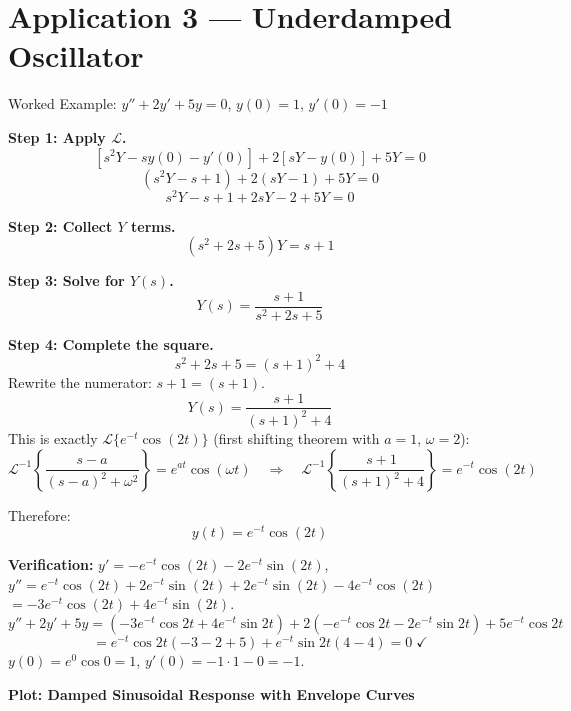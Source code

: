 \documentclass[12pt,a4paper]{article}
\begin{document}
\section{Application 3 --- Underdamped Oscillator}

\begin{infobox}{Worked Example: $y'' + 2y' + 5y = 0$, $y(0)=1$, $y'(0)=-1$}

\textbf{Step 1: Apply $\mathcal{L}$.}
\[
[s^2Y - sy(0) - y'(0)] + 2[sY - y(0)] + 5Y = 0
\]
\[
(s^2Y - s + 1) + 2(sY - 1) + 5Y = 0
\]
\[
s^2Y - s + 1 + 2sY - 2 + 5Y = 0
\]

\textbf{Step 2: Collect $Y$ terms.}
\[
(s^2 + 2s + 5)Y = s + 1
\]

\textbf{Step 3: Solve for $Y(s)$.}
\[
Y(s) = \frac{s+1}{s^2 + 2s + 5}
\]

\textbf{Step 4: Complete the square.}
\[
s^2 + 2s + 5 = (s+1)^2 + 4
\]
Rewrite the numerator: $s + 1 = (s+1)$.
\[
Y(s) = \frac{s+1}{(s+1)^2 + 4}
\]
This is exactly $\mathcal{L}\{e^{-t}\cos(2t)\}$ (first shifting theorem with $a=1$, $\omega=2$):
\[
\mathcal{L}^{-1}\!\left\{\frac{s-a}{(s-a)^2+\omega^2}\right\} = e^{at}\cos(\omega t)
\quad\Rightarrow\quad
\mathcal{L}^{-1}\!\left\{\frac{s+1}{(s+1)^2+4}\right\} = e^{-t}\cos(2t)
\]

Therefore:
\[
\boxed{y(t) = e^{-t}\cos(2t)}
\]

\textbf{Verification:}
$y' = -e^{-t}\cos(2t) - 2e^{-t}\sin(2t)$, \quad
$y'' = e^{-t}\cos(2t) + 2e^{-t}\sin(2t) + 2e^{-t}\sin(2t) - 4e^{-t}\cos(2t)$
$= -3e^{-t}\cos(2t) + 4e^{-t}\sin(2t)$.
\[
y''+2y'+5y = (-3e^{-t}\cos 2t+4e^{-t}\sin 2t)+2(-e^{-t}\cos 2t-2e^{-t}\sin 2t)+5e^{-t}\cos 2t
\]
\[
= e^{-t}\cos 2t(-3-2+5) + e^{-t}\sin 2t(4-4) = 0\;\checkmark
\]
$y(0)=e^0\cos 0=1$\;\checkmark, \;$y'(0)=-1\cdot 1 - 0 = -1$\;\checkmark.
\end{infobox}

\medskip
\textbf{Plot: Damped Sinusoidal Response with Envelope Curves}

\begin{center}
\end{center}
\end{document}
